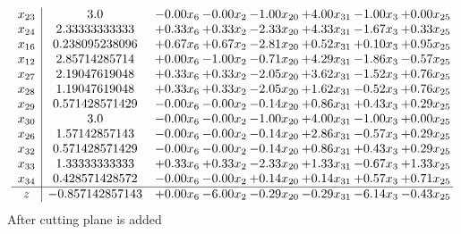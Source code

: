 \documentclass[8pt]{article}
\begin{document}
\[\begin{array}{c| c c@{\hskip 2pt} c@{\hskip 2pt} c@{\hskip 2pt} c@{\hskip 2pt} c@{\hskip 2pt} c@{\hskip 2pt} }
 x_{23}   &  3.0 & -0.00 x_{6} & -0.00 x_{2} & -1.00 x_{20} & +  4.00 x_{31} & -1.00 x_{3} & +  0.00 x_{25}\\
 x_{24}   &  2.33333333333 & +  0.33 x_{6} & +  0.33 x_{2} & -2.33 x_{20} & +  4.33 x_{31} & -1.67 x_{3} & +  0.33 x_{25}\\
 x_{16}   &  0.238095238096 & +  0.67 x_{6} & +  0.67 x_{2} & -2.81 x_{20} & +  0.52 x_{31} & +  0.10 x_{3} & +  0.95 x_{25}\\
 x_{12}   &  2.85714285714 & +  0.00 x_{6} & -1.00 x_{2} & -0.71 x_{20} & +  4.29 x_{31} & -1.86 x_{3} & -0.57 x_{25}\\
 x_{27}   &  2.19047619048 & +  0.33 x_{6} & +  0.33 x_{2} & -2.05 x_{20} & +  3.62 x_{31} & -1.52 x_{3} & +  0.76 x_{25}\\
 x_{28}   &  1.19047619048 & +  0.33 x_{6} & +  0.33 x_{2} & -2.05 x_{20} & +  1.62 x_{31} & -0.52 x_{3} & +  0.76 x_{25}\\
 x_{29}   &  0.571428571429 & -0.00 x_{6} & -0.00 x_{2} & -0.14 x_{20} & +  0.86 x_{31} & +  0.43 x_{3} & +  0.29 x_{25}\\
 x_{30}   &  3.0 & -0.00 x_{6} & -0.00 x_{2} & -1.00 x_{20} & +  4.00 x_{31} & -1.00 x_{3} & +  0.00 x_{25}\\
 x_{26}   &  1.57142857143 & -0.00 x_{6} & -0.00 x_{2} & -0.14 x_{20} & +  2.86 x_{31} & -0.57 x_{3} & +  0.29 x_{25}\\
 x_{32}   &  0.571428571429 & -0.00 x_{6} & -0.00 x_{2} & -0.14 x_{20} & +  0.86 x_{31} & +  0.43 x_{3} & +  0.29 x_{25}\\
 x_{33}   &  1.33333333333 & +  0.33 x_{6} & +  0.33 x_{2} & -2.33 x_{20} & +  1.33 x_{31} & -0.67 x_{3} & +  1.33 x_{25}\\
 x_{34}   &  0.428571428572 & -0.00 x_{6} & -0.00 x_{2} & +  0.14 x_{20} & +  0.14 x_{31} & +  0.57 x_{3} & +  0.71 x_{25}\\
\hline
z    &  -0.857142857143 & +  0.00 x_{6} & -6.00 x_{2} & -0.29 x_{20} & -0.29 x_{31} & -6.14 x_{3} & -0.43 x_{25}\\
\end{array}\]
 After cutting plane is added 
\end{document}
